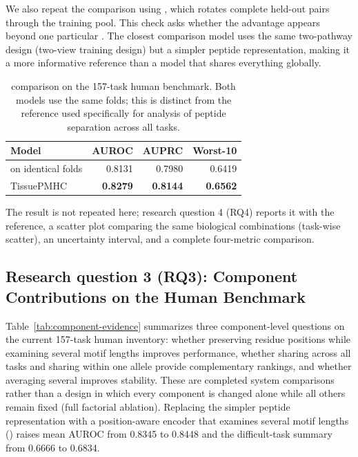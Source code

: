 We also repeat the comparison using \plainPairOOF{}, which rotates complete held-out pairs through the training pool. This check asks whether the advantage appears beyond one particular \plainFixedTest{}. The closest comparison model uses the same two-pathway design (two-view training design) but a simpler peptide representation, making it a more informative reference than a model that shares everything globally.

\begin{table}[tbp]
\centering
\caption{\plainPairOOF{} comparison on the 157-task human benchmark. Both models use the same folds; this is distinct from the \plainMatchedOOF{} reference used specifically for analysis of peptide separation across all tasks.}
\label{tab:human-matched-oof}
\small
\begin{tabularx}{\textwidth}{>{\raggedright\arraybackslash}Xrrr}
\toprule
Model & AUROC & AUPRC & Worst-10 \\ 
\midrule
\plainAuxDual{} on identical folds & 0.8131 & 0.7980 & 0.6419 \\ 
TissuePMHC & \textbf{0.8279} & \textbf{0.8144} & \textbf{0.6562} \\ 
\bottomrule
\end{tabularx}
\end{table}

The \plainPeptideOOF{} result is not repeated here; research question 4 (RQ4) reports it with the \plainMatchedOOF{} reference, a scatter plot comparing the same biological combinations (task-wise scatter), an uncertainty interval, and a complete four-metric comparison.

\subsection{Research question 3 (RQ3): Component Contributions on the Human Benchmark}

Table~\ref{tab:component-evidence} summarizes three component-level questions on the current 157-task human inventory: whether preserving residue positions while examining several motif lengths improves performance, whether sharing across all tasks and sharing within one \plainHLA{} allele provide complementary rankings, and whether averaging several \plainSeeds{} improves stability. These are completed system comparisons rather than a design in which every component is changed alone while all others remain fixed (full factorial ablation). Replacing the simpler peptide representation with a position-aware encoder that examines several motif lengths (\plainMultiKernel{}) raises mean AUROC from 0.8345 to 0.8448 and the difficult-task summary from 0.6666 to 0.6834.

